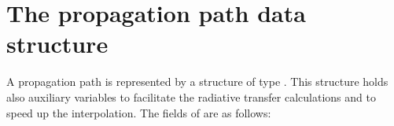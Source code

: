 


\section{The propagation path data structure}
\label{sec:ppath:Ppath}

A propagation path is represented by a structure of type
. This structure holds also auxiliary variables to
facilitate the radiative transfer calculations and to speed up the
interpolation. The fields of  are as follows:

